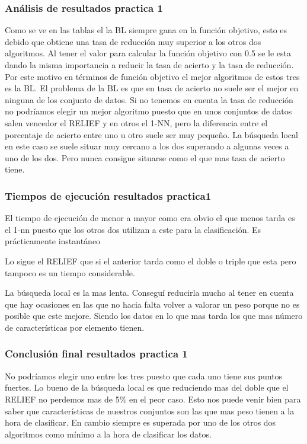 \documentclass[titlepage]{article}
\begin{document}
	
	\subsubsection{Análisis de resultados practica 1}
	Como se ve en las tablas el la BL siempre gana en la función objetivo, esto es debido que obtiene una tasa de reducción muy superior a los otros dos algoritmos. Al tener el valor para calcular la función objetivo con 0.5 se le esta dando la misma importancia a reducir la tasa de acierto y la tasa de reducción. Por este motivo en términos de función objetivo el mejor algoritmos de estos tres es la BL. El problema de la BL es que en tasa de acierto no suele ser el mejor en ninguna de los conjunto de datos. Si no tenemos en cuenta la tasa de reducción no podríamos elegir un mejor algoritmo puesto que en unos conjuntos de datos salen vencedor el RELIEF y en otros el 1-NN, pero la diferencia entre el porcentaje de acierto entre uno u otro suele ser muy pequeño. La búsqueda local en este caso se suele situar muy cercano a los dos superando a algunas veces a uno de los dos. Pero nunca consigue situarse como el que mas tasa de acierto tiene.
	
	\subsubsection{Tiempos de ejecución resultados practica1 }
		El tiempo de ejecución de menor a mayor como era obvio el que menos tarda es el 1-nn puesto que los otros dos utilizan a este para la clasificación. Es prácticamente instantáneo
	
	Lo sigue el RELIEF que si el anterior tarda como el doble o triple que esta pero tampoco es un tiempo considerable.
	
	La búsqueda local es la mas lenta. Conseguí reducirla mucho al tener en cuenta que hay ocasiones en las que no hacia falta volver a valorar un peso porque no es posible que este mejore. Siendo los datos en lo que mas tarda los que mas número de características por elemento tienen.
	
	
	\subsubsection{Conclusión final resultados practica 1}
	No podríamos elegir uno entre los tres puesto que cada uno tiene sus puntos fuertes. Lo bueno de la búsqueda local es que reduciendo mas del doble que el RELIEF no perdemos mas de 5\% en el peor caso. Esto nos puede venir bien para saber que características de nuestros conjuntos son las que mas peso tienen a la hora de clasificar. En cambio siempre es superada por uno de los otros dos algoritmos como mínimo a la hora de clasificar los datos.
\end{document}
